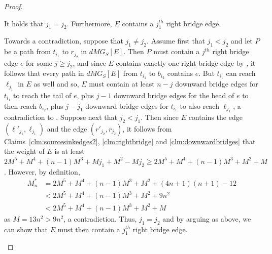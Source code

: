 \begin{proof}
\begin{claim}
\label{clm:j1=j2}
It holds that $j_1 = j_2$. Furthermore, $E$ contains a $j_1^{th}$ right bridge edge.
\end{claim}

\begin{claimproof}
Towards a contradiction, suppose that $j_1 \neq j_2$.
Assume first that $j_1 < j_2$ and let $P$ be a path from $t_{i_1}$ to $r_{j_2}$ in $dMG_S[E]$. Then $P$ must contain a $j^{th}$ right bridge edge $e$ for some $j \geq j_2$, and since $E$ contains exactly one right bridge edge by , it follows that every path in $dMG_S[E]$ from $t_{i_1}$ to $b_{i_2}$ contains $e$. But $t_{i_1}$ can reach $\ell_{j_1}$ in $E$ as well and so, $E$ must contain at least $n-j$ downward bridge edges for $t_{i_1}$ to reach the tail of $e$, plus $j -1$ downward bridge edges for the head of $e$ to then reach $b_{i_2}$, plus $j-j_1$ downward bridge edges for $t_{i_1}$ to also reach $\ell_{j_1}$, a contradiction to . Suppose next that $j_2 < j_1$. Then since $E$ contains the edge $(\ell'_{j_1},\ell_{j_1})$ and the edge $(r'_{j_2},r_{j_2})$, it follows from Claims~\ref{clm:sourcesinkedges2}, \ref{clm:rightbridge} and \ref{clm:downwardbridges} that the weight of $E$ is at least $2M^5 + M^4 + (n-1)M^3 + Mj_1 + M^2 - Mj_2 \geq 2M^5 + M^4 + (n-1)M^3 + M^2 + M$. However, by definition,
\begin{equation*}
\begin{split}
M_n^* &= 2M^5 + M^4 + (n-1)M^3 + M^2 + (4n+1)(n+1) - 12\\
& <  2M^5 + M^4 + (n-1)M^3 + M^2 + 9n^2\\
& < 2M^5 + M^4 + (n-1)M^3 + M^2 + M
\end{split}
\end{equation*}
as $M = 13n^2 > 9n^2$, a contradiction. Thus, $j_1 = j_2$ and by arguing as above, we can show that $E$ must then contain a $j_1^{th}$ right bridge edge.
\end{claimproof}


\end{proof}
